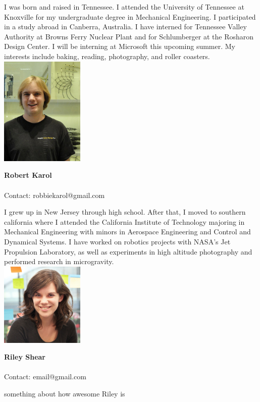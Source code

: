 I was born and raised in Tennessee. I attended the University of Tennessee at Knoxville for my undergraduate degree in Mechanical Engineering. I participated in a study abroad in Canberra, Australia. I have interned for Tennessee Valley Authority at Browns Ferry Nuclear Plant and for Schlumberger at the Rosharon Design Center. I will be interning at Microsoft this upcoming summer. My interests include baking, reading, photography, and roller coasters.
\\

\noindent \includegraphics[width=40mm]{images/robert_karol.jpg}
\parbox[b]{0.6\textwidth}{\textbf{Robert Karol}\\ \\
Contact: robbiekarol@gmail.com  \\
}

I grew up in New Jersey through high school. After that, I moved to southern california where I attended the California Institute of Technology majoring in Mechanical Engineering with minors in Aerospace Engineering and Control and Dynamical Systems. I have worked on robotics projects with NASA’s Jet Propulsion Laboratory, as well as experiments in high altitude photography and performed research in microgravity.
\\

\noindent \includegraphics[width=40mm]{images/annika.jpg}
\parbox[b]{0.6\textwidth}{\textbf{Riley Shear}\\ \\
Contact: email@gmail.com  \\
}

something about how awesome Riley is

